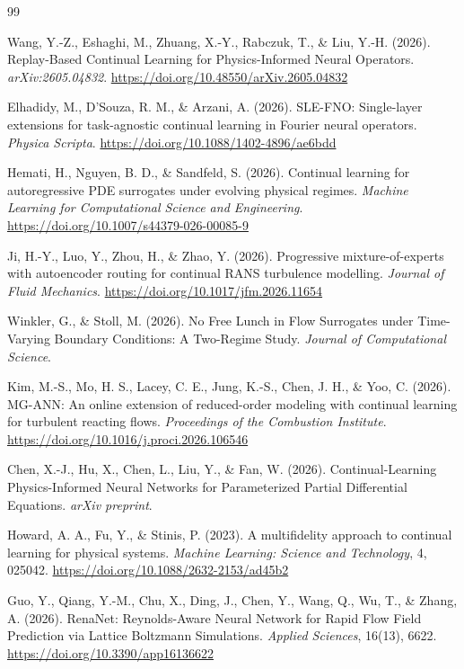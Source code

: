 \documentclass[11pt,a4paper]{article}
\begin{document}
\FloatBarrier
\begin{thebibliography}{99}

Wang, Y.-Z., Eshaghi, M., Zhuang, X.-Y., Rabczuk, T., \& Liu, Y.-H. (2026). Replay-Based Continual Learning for Physics-Informed Neural Operators. \textit{arXiv:2605.04832}. \url{https://doi.org/10.48550/arXiv.2605.04832}

Elhadidy, M., D'Souza, R. M., \& Arzani, A. (2026). SLE-FNO: Single-layer extensions for task-agnostic continual learning in Fourier neural operators. \textit{Physica Scripta}. \url{https://doi.org/10.1088/1402-4896/ae6bdd}

Hemati, H., Nguyen, B. D., \& Sandfeld, S. (2026). Continual learning for autoregressive PDE surrogates under evolving physical regimes. \textit{Machine Learning for Computational Science and Engineering}. \url{https://doi.org/10.1007/s44379-026-00085-9}

Ji, H.-Y., Luo, Y., Zhou, H., \& Zhao, Y. (2026). Progressive mixture-of-experts with autoencoder routing for continual RANS turbulence modelling. \textit{Journal of Fluid Mechanics}. \url{https://doi.org/10.1017/jfm.2026.11654}

Winkler, G., \& Stoll, M. (2026). No Free Lunch in Flow Surrogates under Time-Varying Boundary Conditions: A Two-Regime Study. \textit{Journal of Computational Science}.

Kim, M.-S., Mo, H. S., Lacey, C. E., Jung, K.-S., Chen, J. H., \& Yoo, C. (2026). MG-ANN: An online extension of reduced-order modeling with continual learning for turbulent reacting flows. \textit{Proceedings of the Combustion Institute}. \url{https://doi.org/10.1016/j.proci.2026.106546}

Chen, X.-J., Hu, X., Chen, L., Liu, Y., \& Fan, W. (2026). Continual-Learning Physics-Informed Neural Networks for Parameterized Partial Differential Equations. \textit{arXiv preprint}.

Howard, A. A., Fu, Y., \& Stinis, P. (2023). A multifidelity approach to continual learning for physical systems. \textit{Machine Learning: Science and Technology}, 4, 025042. \url{https://doi.org/10.1088/2632-2153/ad45b2}

Guo, Y., Qiang, Y.-M., Chu, X., Ding, J., Chen, Y., Wang, Q., Wu, T., \& Zhang, A. (2026). RenaNet: Reynolds-Aware Neural Network for Rapid Flow Field Prediction via Lattice Boltzmann Simulations. \textit{Applied Sciences}, 16(13), 6622. \url{https://doi.org/10.3390/app16136622}


\end{thebibliography}
\end{document}
